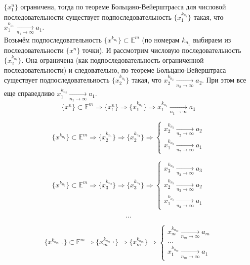 \documentclass[a4paper,12pt]{article} %
\begin{document}
	$\{x_1^n \}$ ограничена, тогда по теореме Больцано-Вейерштраcса для числовой последовательности существует подпоследовательность $\{x_1^{k_{n_1}} \}$ такая, что $x_1^{k_{n_1}} \xrightarrow[n_1 \to \infty]{} a_1$.\\
	
	Возьмём подпоследовательность $\{x^{k_{n_1}} \} \subset \mathbb{E}^m$ (по номерам $k_{n_1}$ выбираем из последовательности $\{x^n \}$ точки). И рассмотрим числовую последовательность $\{x_2^{k_{n_1}} \}$. Она ограничена (как подпоследовательность ограниченной последовательности) и следовательно, по теореме Больцано-Вейерштраса существует подпоследовательность $\{x_2^{k_{n_2}} \}$ такая, что $x_2^{k_{n_2}} \xrightarrow[n_2 \to \infty]{} a_2$. При этом все еще справедливо $x_1^{k_{n_2}} \xrightarrow[n_2 \to \infty]{} a_1$.\\
	
	\begin{equation*}
		\{x^n \} \subset \mathbb{E}^m \Rightarrow \{x_1^n \} \Rightarrow \{x_1^{k_{n_1}} \} \Rightarrow x_1^{k_{n_1}} \xrightarrow[n_1 \to \infty]{} a_1
	\end{equation*}
	
	\begin{equation*}
		\{x^{k_{n_1}} \} \subset \mathbb{E}^m \Rightarrow \{x_2^{k_{n_1}} \} \Rightarrow \{x_2^{k_{n_2}} \} \Rightarrow 
		\begin{cases}
			x_2^{k_{n_2}} \xrightarrow[n_2 \to \infty]{} a_2\\
			x_1^{k_{n_2}} \xrightarrow[n_2 \to \infty]{} a_1
		\end{cases}    
	\end{equation*}
	
	\begin{equation*}
		\{x^{k_{n_2}} \} \subset \mathbb{E}^m \Rightarrow \{x_3^{k_{n_2}} \} \Rightarrow \{x_3^{k_{n_3}} \} \Rightarrow 
		\begin{cases}
			x_3^{k_{n_3}} \xrightarrow[n_3 \to \infty]{} a_3\\
			x_2^{k_{n_3}} \xrightarrow[n_3 \to \infty]{} a_2\\
			x_1^{k_{n_3}} \xrightarrow[n_3 \to \infty]{} a_1
		\end{cases}    
	\end{equation*}
	
	\[ \dots \]
	
	\begin{equation*}
		\{x^{k_{n_{m-1}}} \} \subset \mathbb{E}^m \Rightarrow \{x_m^{k_{n_{m-1}}} \} \Rightarrow \{x_m^{k_{n_m}} \} \Rightarrow 
		\begin{cases}
			x_m^{k_{n_m}} \xrightarrow[n_m \to \infty]{} a_m\\
			\dots \\
			x_1^{k_{n_m}} \xrightarrow[n_m \to \infty]{} a_1
		\end{cases}    
	\end{equation*}
	
\end{document}
